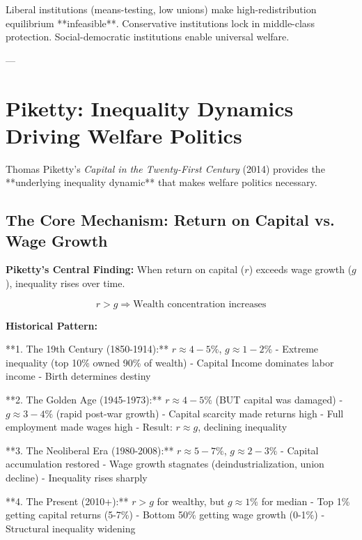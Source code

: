 Liberal institutions (means-testing, low unions) make high-redistribution equilibrium **infeasible**. Conservative institutions lock in middle-class protection. Social-democratic institutions enable universal welfare.

---

\clearpage


\section{Piketty: Inequality Dynamics Driving Welfare Politics}
\label{sec:piketty}

Thomas Piketty's \emph{Capital in the Twenty-First Century} (2014) provides the **underlying inequality dynamic** that makes welfare politics necessary.

\subsection{The Core Mechanism: Return on Capital vs. Wage Growth}

\textbf{Piketty's Central Finding:} When return on capital ($r$) exceeds wage growth ($g$), inequality rises over time.

\begin{equation}
r > g \Rightarrow \text{Wealth concentration increases}
\end{equation}

\textbf{Historical Pattern:}

**1. The 19th Century (1850-1914):** $r \approx 4-5\%$, $g \approx 1-2\%$
- Extreme inequality (top 10\% owned 90\% of wealth)
- Capital Income dominates labor income
- Birth determines destiny

**2. The Golden Age (1945-1973):** $r \approx 4-5\%$ (BUT capital was damaged)
- $g \approx 3-4\%$ (rapid post-war growth)
- Capital scarcity made returns high
- Full employment made wages high
- Result: $r \approx g$, declining inequality

**3. The Neoliberal Era (1980-2008):** $r \approx 5-7\%$, $g \approx 2-3\%$
- Capital accumulation restored
- Wage growth stagnates (deindustrialization, union decline)
- Inequality rises sharply

**4. The Present (2010+):** $r > g$ for wealthy, but $g \approx 1\%$ for median
- Top 1\% getting capital returns (5-7\%)
- Bottom 50\% getting wage growth (0-1\%)
- Structural inequality widening

